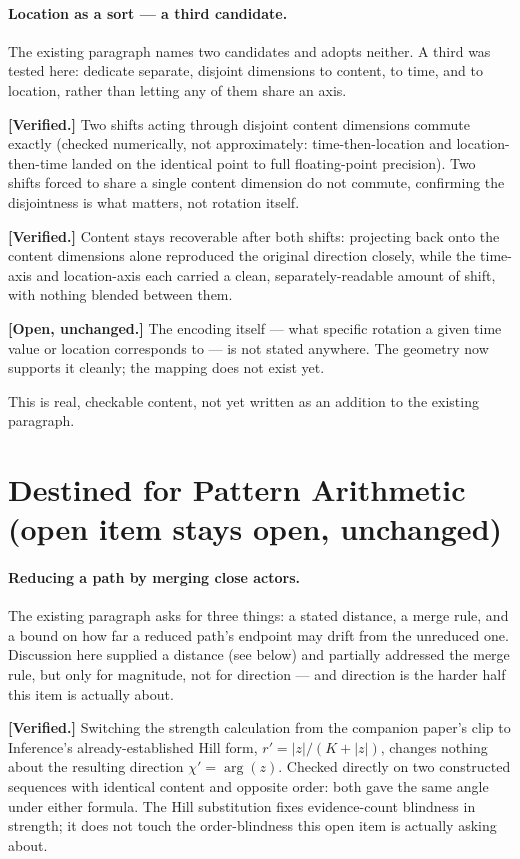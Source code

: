 \documentclass[11pt]{article}
\begin{document}
\paragraph{Location as a sort --- a third candidate.} The existing
paragraph names two candidates and adopts neither. A third was tested
here: dedicate separate, disjoint dimensions to content, to time, and
to location, rather than letting any of them share an axis.

\textbf{[Verified.]} Two shifts acting through disjoint content
dimensions commute exactly (checked numerically, not approximately:
time-then-location and location-then-time landed on the identical
point to full floating-point precision). Two shifts forced to share a
single content dimension do not commute, confirming the disjointness
is what matters, not rotation itself.

\textbf{[Verified.]} Content stays recoverable after both shifts:
projecting back onto the content dimensions alone reproduced the
original direction closely, while the time-axis and location-axis
each carried a clean, separately-readable amount of shift, with
nothing blended between them.

\textbf{[Open, unchanged.]} The encoding itself --- what specific
rotation a given time value or location corresponds to --- is not
stated anywhere. The geometry now supports it cleanly; the mapping
does not exist yet.

This is real, checkable content, not yet written as an addition to
the existing paragraph.

\section{Destined for Pattern Arithmetic (open item stays open, unchanged)}

\paragraph{Reducing a path by merging close actors.} The existing
paragraph asks for three things: a stated distance, a merge rule, and
a bound on how far a reduced path's endpoint may drift from the
unreduced one. Discussion here supplied a distance (see below) and
partially addressed the merge rule, but only for magnitude, not for
direction --- and direction is the harder half this item is actually
about.

\textbf{[Verified.]} Switching the strength calculation from the
companion paper's clip to Inference's already-established Hill form,
$r'=|z|/(K+|z|)$, changes nothing about the resulting direction
$\chi'=\arg(z)$. Checked directly on two constructed sequences with
identical content and opposite order: both gave the same angle under
either formula. The Hill substitution fixes evidence-count blindness
in strength; it does not touch the order-blindness this open item is
actually asking about.
\end{document}
